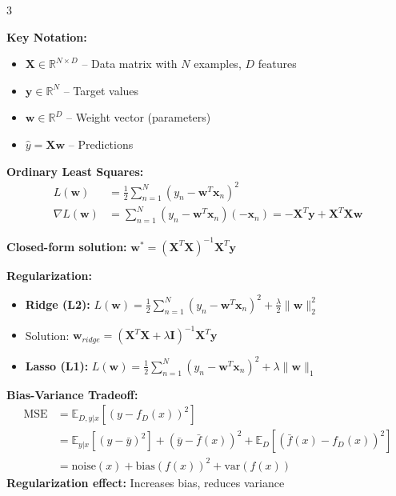 \documentclass[10pt,landscape]{article}
\begin{document}
\scriptsize

\begin{multicols}{3}

\begin{tcolorbox}[breakable, title=Linear Regression, colback=regression, boxsep=1pt, left=1pt, right=1pt, top=1pt, bottom=1pt]
\textbf{Key Notation:}
\begin{itemize}[leftmargin=*,noitemsep,topsep=0pt]
    \item $\mathbf{X} \in \mathbb{R}^{N \times D}$ -- Data matrix with $N$ examples, $D$ features
    \item $\mathbf{y} \in \mathbb{R}^N$ -- Target values
    \item $\mathbf{w} \in \mathbb{R}^D$ -- Weight vector (parameters)
    \item $\hat{y} = \mathbf{X}\mathbf{w}$ -- Predictions
\end{itemize}

\textbf{Ordinary Least Squares:}
\begin{align}
L(\mathbf{w}) &= \frac{1}{2}\sum_{n=1}^N(y_n - \mathbf{w}^T\mathbf{x}_n)^2\\
\nabla L(\mathbf{w}) &= \sum_{n=1}^N(y_n - \mathbf{w}^T\mathbf{x}_n)(-\mathbf{x}_n) = -\mathbf{X}^T\mathbf{y} + \mathbf{X}^T\mathbf{X}\mathbf{w}
\end{align}

\textbf{Closed-form solution:} $\mathbf{w}^* = (\mathbf{X}^T\mathbf{X})^{-1}\mathbf{X}^T\mathbf{y}$

\textbf{Regularization:}
\begin{itemize}[leftmargin=*,noitemsep,topsep=0pt]
    \item \textbf{Ridge (L2):} $L(\mathbf{w}) = \frac{1}{2}\sum_{n=1}^N(y_n - \mathbf{w}^T\mathbf{x}_n)^2 + \frac{\lambda}{2}\|\mathbf{w}\|_2^2$
    \item Solution: $\mathbf{w}_{ridge} = (\mathbf{X}^T\mathbf{X} + \lambda\mathbf{I})^{-1}\mathbf{X}^T\mathbf{y}$
    \item \textbf{Lasso (L1):} $L(\mathbf{w}) = \frac{1}{2}\sum_{n=1}^N(y_n - \mathbf{w}^T\mathbf{x}_n)^2 + \lambda\|\mathbf{w}\|_1$
\end{itemize}

\textbf{Bias-Variance Tradeoff:}
\begin{align}
\text{MSE} &= \mathbb{E}_{D,y|x}[(y - f_D(x))^2]\\
&= \mathbb{E}_{y|x}[(y - \bar{y})^2] + (\bar{y} - \bar{f}(x))^2 + \mathbb{E}_D[(\bar{f}(x) - f_D(x))^2]\\
&= \text{noise}(x) + \text{bias}(f(x))^2 + \text{var}(f(x))
\end{align}
\textbf{Regularization effect:} Increases bias, reduces variance
\end{tcolorbox}


\end{multicols}
\end{document}
